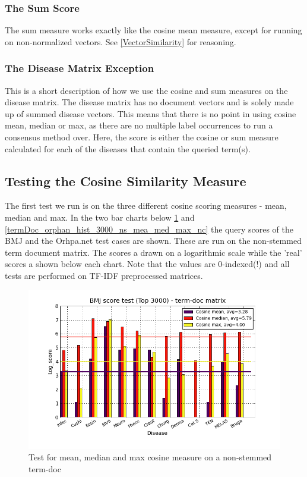 \subsubsection{The Sum Score}

The sum measure works exactly like the cosine mean measure, except for
running on non-normalized vectors. See \ref{VectorSimilarity} for
reasoning.

\subsubsection{The Disease Matrix Exception}

This is a short description of how we use the cosine and sum measures
on the disease matrix. The disease matrix has no document vectors and
is solely made up of summed disease vectors. This means that there is
no point in using cosine mean, median or max, as there are no multiple
label occurrences to run a consensus method over. Here, the score is
either the cosine or sum measure calculated for each of the diseases
that contain the queried term(s).

\subsection{Testing the Cosine Similarity Measure\label{TestingCosineSimilarity}}

The first test we run is on the three different cosine scoring
measures - mean, median and max. In the two bar charts below
\ref{termDoc_bmj_hist_3000_ns_mea_med_max_nc} and
\ref{termDoc_orphan_hist_3000_ns_mea_med_max_nc} the query scores of
the BMJ and the Orhpa.net test cases are shown. These are run on the
non-stemmed term document matrix. The scores a drawn on a logarithmic
scale while the 'real' scores a shown below each chart. Note that the
values are 0-indexed(!) and all tests are performed on TF-IDF
preprocessed matrices.

\begin{figure}[H]
  \caption{Test for mean, median and max cosine measure on a non-stemmed term-doc}
  \begin{center}
    \includegraphics[width=1.2\textwidth]{barcharts/termDoc_bmj_hist_3000_ns_mea_med_max_nc.png}
  \end{center}
  \label{termDoc_bmj_hist_3000_ns_mea_med_max_nc}
\end{figure}

